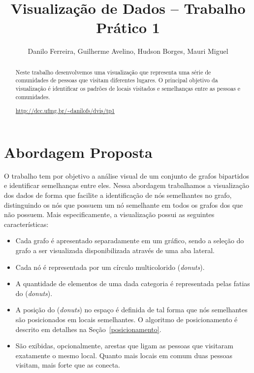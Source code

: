 \documentclass[12pt]{article}
\title{Visualização de Dados -- Trabalho Prático 1}
\author{Danilo Ferreira, Guilherme Avelino, Hudson Borges, Mauri Miguel}
\begin{document}
\maketitle

\begin{abstract}
Neste trabalho desenvolvemos uma visualização que representa uma série de comunidades de pessoas que visitam diferentes lugares. O principal objetivo da visualização é identificar os padrões de locais visitados e semelhanças entre as pessoas e comunidades.\\
\centerline{\url{http://dcc.ufmg.br/~danilofs/dvis/tp1}}
\end{abstract}


\section{Abordagem Proposta}

O trabalho tem por objetivo a análise visual de um conjunto de grafos bipartidos e identificar semelhanças entre eles. Nessa abordagem trabalhamos a visualização dos dados de forma que facilite a identificação de nós semelhantes no grafo, distinguindo os nós que possuem um nó semelhante em todos os grafos dos que não possuem. Mais especificamente, a visualização possui as seguintes características:
\begin{itemize} 
	\item Cada grafo é apresentado separadamente em um gráfico, sendo a seleção do grafo a ser visualizada disponibilizada através de uma aba lateral.
	\item Cada nó é representada por um círculo multicolorido (\textit{donuts}). 
	\item A quantidade de elementos de uma dada categoria é representada pelas fatias do  (\textit{donuts}).
	\item A posição do (\textit{donuts}) no espaço é definida de tal forma que nós semelhantes são posicionados em locais semelhantes. O algoritmo de posicionamento é descrito em detalhes na Seção~\ref{posicionamento}.
	\item São exibidas, opcionalmente, arestas que ligam as pessoas que visitaram exatamente o mesmo local. Quanto mais locais em comum duas pessoas visitam, mais forte que as conecta.
	
\end{itemize}
\end{document}
